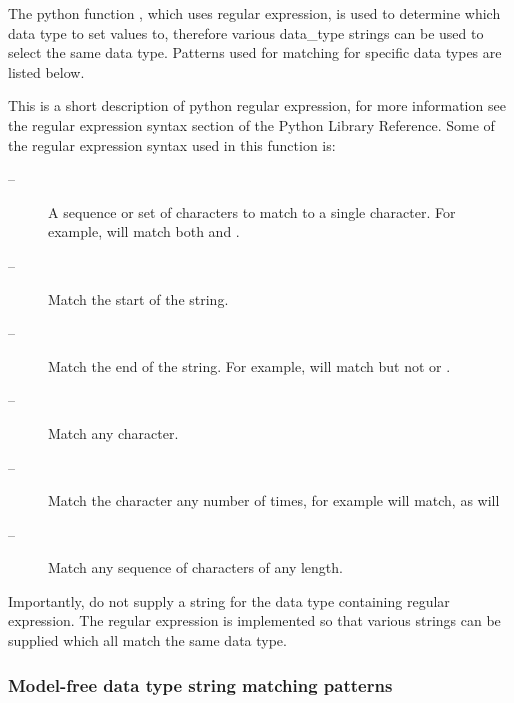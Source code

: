 The python function , which uses regular expression, is used to determine which data type to set values to, therefore various data\_type strings can be used to select the same data type.  Patterns used for matching for specific data types are listed below.


This is a short description of python regular expression, for more information see the regular expression syntax section of the Python Library Reference.  Some of the regular expression syntax used in this function is:


\begin{description}
\item[\quotecmd{[]} --]  A sequence or set of characters to match to a single character.  For example,  will match both  and . 
\item[\quotecmd{\^{}} --]  Match the start of the string. 
\item[\quotecmd{\$} --]  Match the end of the string.  For example,  will match  but not  or . 
\item[ --]  Match any character. 
\item[ --]  Match the character  any number of times, for example  will match, as will  
\item[ --]  Match any sequence of characters of any length. 
\end{description}


Importantly, do not supply a string for the data type containing regular expression.  The regular expression is implemented so that various strings can be supplied which all match the same data type.



\subsubsection{Model-free data type string matching patterns}

